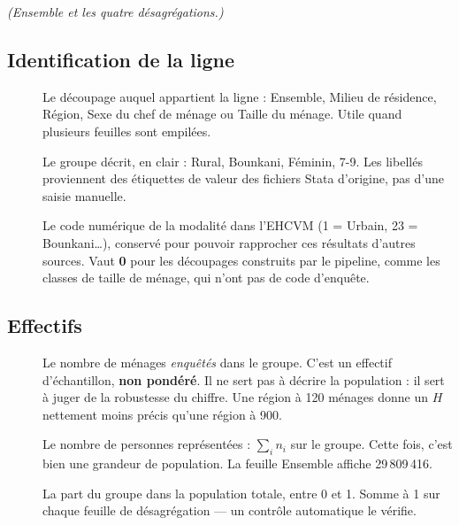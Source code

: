 \documentclass[11pt,a4paper]{article}
\begin{document}
\emph{(\textsf{Ensemble} et les quatre désagrégations.)}

\subsection{Identification de la ligne}

\begin{description}
  \item[] Le découpage auquel appartient la ligne : \textsf{Ensemble},
  \textsf{Milieu de résidence}, \textsf{Région}, \textsf{Sexe du chef de ménage} ou
  \textsf{Taille du ménage}. Utile quand plusieurs feuilles sont empilées.

  \item[] Le groupe décrit, en clair : \textsf{Rural}, \textsf{Bounkani},
  \textsf{Féminin}, \textsf{7-9}. Les libellés proviennent des étiquettes de valeur des fichiers
  Stata d'origine, pas d'une saisie manuelle.

  \item[] Le code numérique de la modalité dans l'EHCVM (1 = Urbain, 23 = Bounkani\ldots),
  conservé pour pouvoir rapprocher ces résultats d'autres sources. Vaut \textbf{0} pour les
  découpages construits par le pipeline, comme les classes de taille de ménage, qui n'ont pas de
  code d'enquête.
\end{description}

\subsection{Effectifs}

\begin{description}
  \item[] Le nombre de ménages \emph{enquêtés} dans le groupe. C'est un effectif
  d'échantillon, \textbf{non pondéré}. Il ne sert pas à décrire la population : il sert à juger de
  la robustesse du chiffre. Une région à 120 ménages donne un $H$ nettement moins précis qu'une
  région à 900.

  \item[] Le nombre de personnes représentées : $\sum_i n_i$ sur le groupe. Cette
  fois, c'est bien une grandeur de population. La feuille \textsf{Ensemble} affiche 29\,809\,416.

  \item[] La part du groupe dans la population totale, entre 0 et 1. Somme à
  1 sur chaque feuille de désagrégation --- un contrôle automatique le vérifie.
\end{description}
\end{document}
